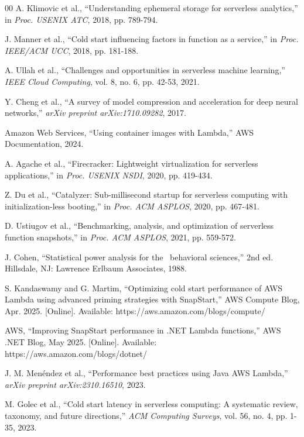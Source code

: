 \documentclass[conference]{IEEEtran}
\begin{document}
\begin{thebibliography}{00}
 A. Klimovic et al., ``Understanding ephemeral storage for serverless analytics,'' in \textit{Proc. USENIX ATC}, 2018, pp. 789-794.

 J. Manner et al., ``Cold start influencing factors in function as a service,'' in \textit{Proc. IEEE/ACM UCC}, 2018, pp. 181-188.

 A. Ullah et al., ``Challenges and opportunities in serverless machine learning,'' \textit{IEEE Cloud Computing}, vol. 8, no. 6, pp. 42-53, 2021.

 Y. Cheng et al., ``A survey of model compression and acceleration for deep neural networks,'' \textit{arXiv preprint arXiv:1710.09282}, 2017.

 Amazon Web Services, ``Using container images with Lambda,'' AWS Documentation, 2024.

 A. Agache et al., ``Firecracker: Lightweight virtualization for serverless applications,'' in \textit{Proc. USENIX NSDI}, 2020, pp. 419-434.

 Z. Du et al., ``Catalyzer: Sub-millisecond startup for serverless computing with initialization-less booting,'' in \textit{Proc. ACM ASPLOS}, 2020, pp. 467-481.

 D. Ustiugov et al., ``Benchmarking, analysis, and optimization of serverless function snapshots,'' in \textit{Proc. ACM ASPLOS}, 2021, pp. 559-572.

 J. Cohen, ``Statistical power analysis for the 
behavioral sciences,'' 2nd ed. Hillsdale, NJ: Lawrence Erlbaum Associates, 1988.

 S. Kandaswamy and G. Martim, ``Optimizing cold start performance of AWS Lambda using advanced priming strategies with SnapStart,'' AWS Compute Blog, Apr. 2025. [Online]. Available: https://aws.amazon.com/blogs/compute/

 AWS, ``Improving SnapStart performance in .NET Lambda functions,'' AWS .NET Blog, May 2025. [Online]. Available: https://aws.amazon.com/blogs/dotnet/

 J. M. Menéndez et al., ``Performance best practices using Java AWS Lambda,'' \textit{arXiv preprint arXiv:2310.16510}, 2023.

 M. Golec et al., ``Cold start latency in serverless computing: A systematic review, taxonomy, and future directions,'' \textit{ACM Computing Surveys}, vol. 56, no. 4, pp. 1-35, 2023.


\end{thebibliography}
\end{document}
